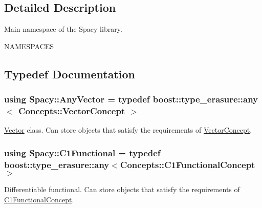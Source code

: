 \subsection{Detailed Description}
Main namespace of the Spacy library. 

N\+A\+M\+E\+S\+P\+A\+C\+E\+S 

\subsection{Typedef Documentation}
\hypertarget{group__SpacyGroup_gafc144d2730ef87a67e54f8cd750b1f54_gafc144d2730ef87a67e54f8cd750b1f54}{}
\subsubsection[{Any\+Vector}]{\setlength{\rightskip}{0pt plus 5cm}using {\bf Spacy\+::\+Any\+Vector} = typedef boost\+::type\+\_\+erasure\+::any$<$ {\bf Concepts\+::\+Vector\+Concept} $>$}\label{group__SpacyGroup_gafc144d2730ef87a67e54f8cd750b1f54_gafc144d2730ef87a67e54f8cd750b1f54}


\hyperlink{classSpacy_1_1Vector}{Vector} class. Can store objects that satisfy the requirements of \hyperlink{group__ConceptGroup_gad6958389d1fa2758a8a64a0a24c36004_VectorConceptAnchor}{Vector\+Concept}. 

\label{group__SpacyGroup_gafc144d2730ef87a67e54f8cd750b1f54_VectorAnchor}%
\hypertarget{group__SpacyGroup_gafc144d2730ef87a67e54f8cd750b1f54_VectorAnchor}{}%
\hypertarget{group__SpacyGroup_gaa7cb8ef6c287b0af0352d3dd0eb9f200_gaa7cb8ef6c287b0af0352d3dd0eb9f200}{}
\subsubsection[{C1\+Functional}]{\setlength{\rightskip}{0pt plus 5cm}using {\bf Spacy\+::\+C1\+Functional} = typedef boost\+::type\+\_\+erasure\+::any$<${\bf Concepts\+::\+C1\+Functional\+Concept}$>$}\label{group__SpacyGroup_gaa7cb8ef6c287b0af0352d3dd0eb9f200_gaa7cb8ef6c287b0af0352d3dd0eb9f200}


Differentiable functional. Can store objects that satisfy the requirements of \hyperlink{group__ConceptGroup_ga205b55d8291e0f2e143f116cf78bc54f_C1FunctionalConceptAnchor}{C1\+Functional\+Concept}. 

\label{group__SpacyGroup_gaa7cb8ef6c287b0af0352d3dd0eb9f200_C1FunctionalAnchor}%
\hypertarget{group__SpacyGroup_gaa7cb8ef6c287b0af0352d3dd0eb9f200_C1FunctionalAnchor}{}%
\hypertarget{group__SpacyGroup_ga87ae8cb0d7a567a4bb181e0a9f182620_ga87ae8cb0d7a567a4bb181e0a9f182620}{}
